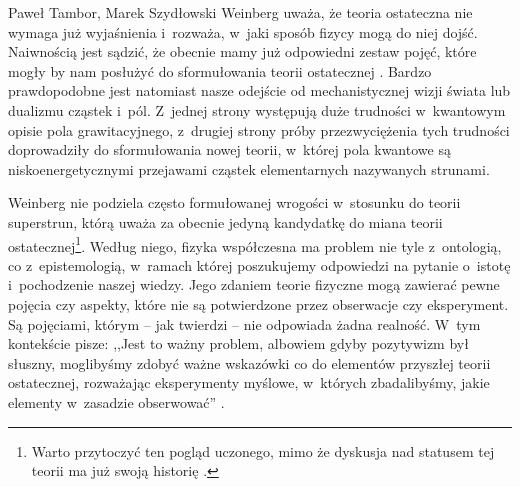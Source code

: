 \begin{artplenv}{Paweł Tambor, Marek Szydłowski}
Weinberg uważa, że teoria ostateczna nie wymaga już wyjaśnienia i~rozważa, w~jaki sposób fizycy mogą do niej dojść. Naiwnością jest sądzić, że obecnie mamy już odpowiedni zestaw pojęć, które mogły by nam posłużyć do sformułowania teorii ostatecznej
\parencite[][s.~139]{weinberg_sen_1992}. %
 Bardzo prawdopodobne jest natomiast nasze odejście od mechanistycznej wizji świata lub dualizmu cząstek i~pól. Z~jednej strony występują duże trudności w~kwantowym opisie pola grawitacyjnego, z~drugiej strony próby przezwyciężenia tych trudności doprowadziły do sformułowania nowej teorii, w~której pola kwantowe są niskoenergetycznymi przejawami cząstek elementarnych nazywanych strunami.

Weinberg nie podziela często formułowanej wrogości w~stosunku do teorii superstrun, którą uważa za obecnie jedyną kandydatkę do miana teorii ostatecznej\footnote{ Warto przytoczyć ten pogląd uczonego, mimo że dyskusja nad statusem tej teorii ma już swoją historię
\parencite[por.][s.~174]{weinberg_sen_1992}.%
 }. Według niego, fizyka współczesna ma problem nie tyle z~ontologią, co z~epistemologią, w~ramach której poszukujemy odpowiedzi na pytanie o~istotę i~pochodzenie naszej wiedzy. Jego zdaniem teorie fizyczne mogą zawierać pewne pojęcia czy aspekty, które nie są potwierdzone przez obserwacje czy eksperyment. Są pojęciami, którym -- jak twierdzi -- nie odpowiada żadna realność. W~tym kontekście pisze: ,,Jest to ważny problem, albowiem gdyby pozytywizm był słuszny, moglibyśmy zdobyć ważne wskazówki co do elementów przyszłej teorii ostatecznej, rozważając eksperymenty myślowe, w~których zbadalibyśmy, jakie elementy w~zasadzie obserwować'' 
\parencite[][s.~141]{weinberg_sen_1992}.%



\end{artplenv}
